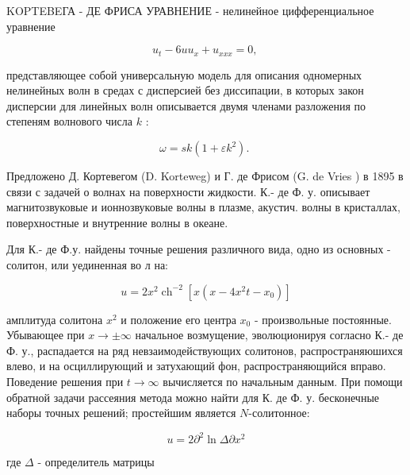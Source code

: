 \documentclass[10pt]{article}
\begin{document}
KOPTEBEГА - ДЕ ФРИСА УРАВНЕНИЕ - нелинейное цифференциальное уравнение



\[

u_{t}-6 u u_{x}+u_{x x x}=0 \text {, }

\]



представляющее собой универсальную модель для описания одномерных нелинейных волн в средах с дисперсией без диссипации, в которых закон дисперсии для линейных волн описывается двумя членами разложения по степеням волнового числа $k$ :



\[

\omega=s k\left(1+\varepsilon k^{2}\right) \text {. }

\]



Предложено Д. Кортевегом (D. Korteweg) и Г. де Фрисом (G. de Vries ) в 1895 в связи с задачей о волнах на поверхности жидкости. К.- де Ф. у. описывает магнитозвуковые и ионнозвуковые волны в плазме, акустич. волны в кристаллах, поверхностные и внутренние волны в океане.



Для К.- де Ф.у. найдены точные решения различного вида, одно из основных - солитон, или уединенная во л на:



\[

u=2 x^{2} \operatorname{ch}^{-2}\left[x\left(x-4 x^{2} t-x_{0}\right)\right]

\]



амплитуда солитона $x^{2}$ и положение его центра $x_{0}$ - произвольные постоянные. Убывающее при $x \rightarrow \pm \infty$ начальное возмущение, эволюционируя согласно К.- де Ф. у., распадается на ряд невзаимодействующих солитонов, распространяюшихся влево, и на осциллирующий и затухающий фон, распространяющийся вправо. Поведение решения при $t \rightarrow \infty$ вычисляется по начальным данным. При помощи обратной задачи рассеяния метода можно найти для К. де Ф. у. бесконечные наборы точных решений; простейшим является $N$-солитонное:



\[

u=2 \partial^{2} \ln \Delta \partial x^{2}

\]



где $\Delta$ - определитель матрицы
\end{document}

